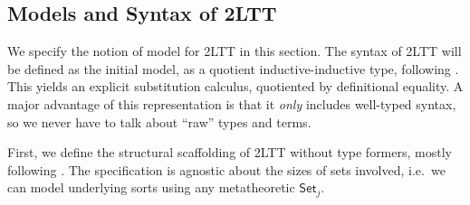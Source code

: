 \documentclass[acmsmall,anonymous,review]{acmart}
\newcommand{\Set}{\mathsf{Set}}
\theoremstyle{remark}
\begin{document}
\subsection{Models and Syntax of 2LTT}\label{sec:2lttmod}

We specify the notion of model for 2LTT in this section. The syntax of 2LTT will
be defined as the initial model, as a quotient inductive-inductive type,
following \cite{ttintt}. This yields an explicit substitution calculus,
quotiented by definitional equality. A major advantage of this representation is
that it \emph{only} includes well-typed syntax, so we never have to talk about
``raw'' types and terms.

First, we define the
structural scaffolding of 2LTT without type formers, mostly following
\cite{twolevel}. The specification is agnostic about the sizes of sets involved,
i.e.\ we can model underlying sorts using any metatheoretic $\Set_j$.
\end{document}

